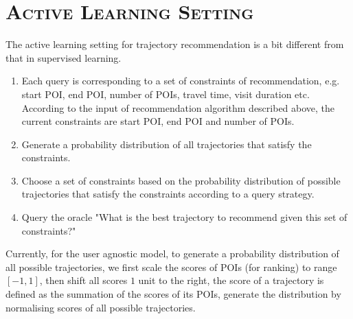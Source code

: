 \documentclass[11pt, a4paper]{article}
\begin{document}
\section{\textsc{Active Learning Setting}}
The active learning setting for trajectory recommendation is a bit different from that in supervised learning.
\begin{enumerate}
\item Each query is corresponding to a set of constraints of recommendation, 
      e.g. start POI, end POI, number of POIs, travel time, visit duration etc.
      According to the input of recommendation algorithm described above, 
      the current constraints are start POI, end POI and number of POIs.
\item Generate a probability distribution of all trajectories that satisfy the constraints.
\item Choose a set of constraints based on the probability distribution of possible trajectories that satisfy the constraints
      according to a query strategy.
\item Query the oracle "What is the best trajectory to recommend given this set of constraints?"
\end{enumerate}
Currently, for the user agnostic model, to generate a probability distribution of all possible trajectories, 
we first scale the scores of POIs (for ranking) to range $[-1, 1]$, then shift all scores $1$ unit to the right,
the score of a trajectory is defined as the summation of the scores of its POIs, 
generate the distribution by normalising scores of all possible trajectories.
\end{document}
